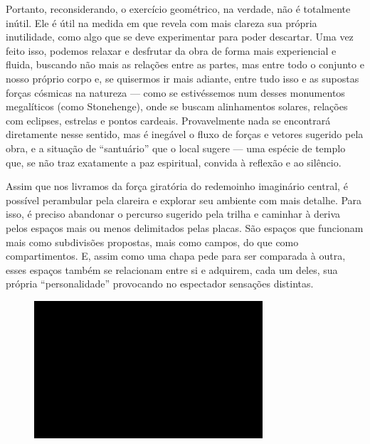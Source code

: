 Portanto, reconsiderando, o exercício geométrico, na verdade, não é
totalmente inútil. Ele é útil na medida em que revela com mais clareza
sua própria inutilidade, como algo que se deve experimentar para poder
descartar. Uma vez feito isso, podemos relaxar e desfrutar da obra de
forma mais experiencial e fluida, buscando não mais as relações entre as
partes, mas entre todo o conjunto e nosso próprio corpo e, se quisermos
ir mais adiante, entre tudo isso e as supostas forças cósmicas na
natureza --- como se estivéssemos num desses monumentos megalíticos (como
Stonehenge), onde se buscam alinhamentos solares, relações com eclipses,
estrelas e pontos cardeais. Provavelmente nada se encontrará diretamente
nesse sentido, mas é inegável o fluxo de forças e vetores sugerido pela
obra, e a situação de ``santuário'' que o local sugere --- uma espécie
de templo que, se não traz exatamente a paz espiritual, convida à
reflexão e ao silêncio.

Assim que nos livramos da força giratória do redemoinho imaginário
central, é possível perambular pela clareira e explorar seu ambiente com
mais detalhe. Para isso, é preciso abandonar o percurso sugerido pela
trilha e caminhar à deriva pelos espaços mais ou menos delimitados pelas
placas. São espaços que funcionam mais como subdivisões propostas, mais
como campos, do que como compartimentos. E, assim como uma chapa pede
para ser comparada à outra, esses espaços também se relacionam entre si
e adquirem, cada um deles, sua própria ``personalidade'' provocando no
espectador sensações distintas.

\begin{figure}[!ht]

\centering
 \includegraphics[width=85mm]{./imgs/im1.jpg}
\caption{\tiny{}}

\end{figure}

